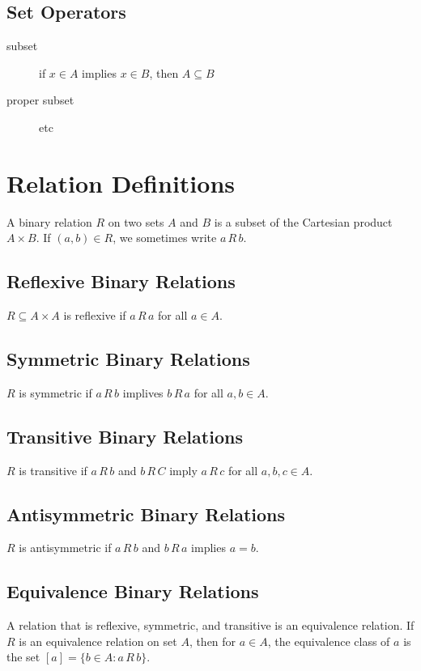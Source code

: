 \documentclass[12pt]{book}
\begin{document}
\subsection{Set Operators}
\begin{description}
\item[subset] if $x \in A$ implies $x \in B$, then $A \subseteq B$
\item[proper subset] etc
\end{description}

\section{Relation Definitions}
A binary relation $R$ on two sets $A$ and $B$ is a subset of the
Cartesian product $A \times B$. If $(a,b) \in R$, we sometimes write
$a\,R\,b$.

\subsection{Reflexive Binary Relations}
$R \subseteq A \times A$ is reflexive if $a\,R\,a$ for all $a \in A$.

\subsection{Symmetric Binary Relations}
$R$ is symmetric if $a\,R\,b$ implives $b\,R\,a$ for all $a,b \in A$.

\subsection{Transitive Binary Relations}
$R$ is transitive if $a\,R\,b$ and $b\,R\,C$ imply $a\,R\,c$ for all
$a,b,c \in A$.

\subsection{Antisymmetric Binary Relations}
$R$ is antisymmetric if $a\,R\,b$ and $b\,R\,a$ implies $a = b$.

\subsection{Equivalence Binary Relations}
A relation that is reflexive, symmetric, and transitive is an
equivalence relation. If $R$ is an equivalence relation on set $A$,
then for $a \in A$, the equivalence class of $a$ is the set
$[a] = \{ b \in A : a\,R\,b \}$.
\end{document}
